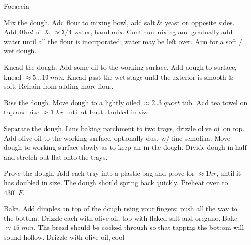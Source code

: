 \begin{recipe}[
preparationtime = 3 hours,
bakingtime = 15 minutes,
source = \citefield{howToBake2013}{title} \cite{howToBake2013}
]
{Focaccia}


\preparation
{

\step Mix the dough.
Add flour to mixing bowl, add salt \& yeast on opposite sides.
Add $40ml$ oil \& $\approx 3/4$ water, hand mix.
Continue mixing and gradually add water until all the flour is incorporated; water may be left over.
Aim for a soft / wet dough.

\step Knead the dough.
Add some oil to the working surface.
Add dough to surface, knead $\approx 5...10\;min$.
Knead past the wet stage until the exterior is smooth \& soft.
Refrain from adding more flour.

\step Rise the dough.
Move dough to a lightly oiled $\approx 2..3\; quart$ tub.
Add tea towel on top and rise $\approx 1\;hr$ until at least doubled in size.

\step Separate the dough.
Line baking parchment to two trays, drizzle olive oil on top.
Add olive oil to the working surface, optionally dust w/ fine semolina.
Move dough to working surface slowly as to keep air in the dough.
Divide dough in half and stretch out flat onto the trays.

\step Prove the dough.
Add each tray into a plastic bag and prove for $\approx 1 hr$, until it has doubled in size.
The dough should spring back quickly.
Preheat oven to $430^\circ \; F$.

\step Bake.
Add dimples on top of the dough using your fingers; push all the way to the bottom.
Drizzle each with olive oil, top with flaked salt and oregano.
Bake $\approx 15 \; min$.
The bread should be cooked through so that tapping the bottom will sound hollow.
Drizzle with olive oil, cool.
}

\end{recipe}
